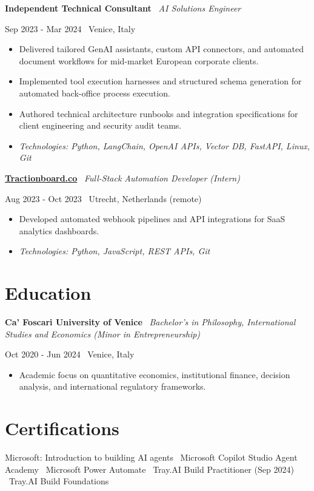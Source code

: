 \documentclass[a4paper,10pt]{article}
\newcommand{\role}[4]{%
  \vspace{2pt}\noindent
  \begin{minipage}[t]{0.70\textwidth}\raggedright\textbf{#1} \textbullet\ \textit{#3}\end{minipage}%
  \hfill
  \begin{minipage}[t]{0.28\textwidth}\raggedleft\footnotesize\color{gray}#2 \textbullet\ #4\end{minipage}%
  \vspace{1pt}%
}
\begin{document}
\role{Independent Technical Consultant}{Sep 2023 - Mar 2024}{AI Solutions Engineer}{Venice, Italy}
\begin{itemize}
  \item Delivered tailored GenAI assistants, custom API connectors, and automated document workflows for mid-market European corporate clients.
  \item Implemented tool execution harnesses and structured schema generation for automated back-office process execution.
  \item Authored technical architecture runbooks and integration specifications for client engineering and security audit teams.
  \item \textit{Technologies: Python, LangChain, OpenAI APIs, Vector DB, FastAPI, Linux, Git}
\end{itemize}

\role{\href{https://tractionboard.co}{Tractionboard.co}}{Aug 2023 - Oct 2023}{Full-Stack Automation Developer (Intern)}{Utrecht, Netherlands (remote)}
\begin{itemize}
  \item Developed automated webhook pipelines and API integrations for SaaS analytics dashboards.
  \item \textit{Technologies: Python, JavaScript, REST APIs, Git}
\end{itemize}

\section{Education}
\role{Ca' Foscari University of Venice}{Oct 2020 - Jun 2024}{Bachelor's in Philosophy, International Studies and Economics (Minor in Entrepreneurship)}{Venice, Italy}
\begin{itemize}
  \item Academic focus on quantitative economics, institutional finance, decision analysis, and international regulatory frameworks.
\end{itemize}

\section{Certifications}
Microsoft: Introduction to building AI agents \textbullet\ Microsoft Copilot Studio Agent Academy \textbullet\ Microsoft Power Automate \textbullet\ Tray.AI Build Practitioner (Sep 2024) \textbullet\ Tray.AI Build Foundations
\end{document}
